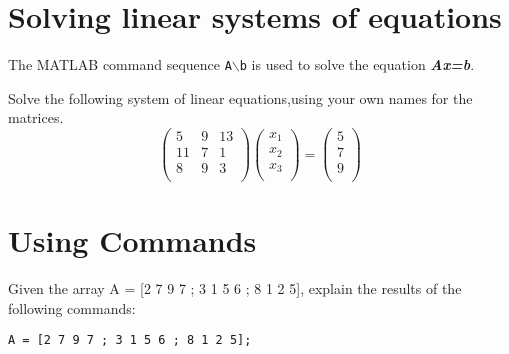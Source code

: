 \documentclass[a4paper,12pt]{article}
\begin{document}
\section{Solving linear systems of equations}

The MATLAB command sequence \texttt{A$\backslash$b} is used to solve the equation  \textbf{\textit{Ax=b}}.


Solve the following system of linear equations,using your own names for the matrices.
\[\left(
\begin{array}{ccc}
5 & 9 & 13 \\
11 & 7 & 1 \\
8 & 9 & 3 \\
\end{array}
\right)
\left(
\begin{array}{c}
x_1 \\
x_2 \\
x_3 \\
\end{array}
\right)
=\left(
\begin{array}{c}
5  \\
7  \\
9  \\
\end{array}
\right)\]


\section{Using Commands}

Given the array A = [2 7 9 7 ; 3 1 5 6 ; 8 1 2 5], explain the results of the following commands:

\begin{framed}
\begin{verbatim}
A = [2 7 9 7 ; 3 1 5 6 ; 8 1 2 5];

\end{verbatim}
\end{framed}
\end{document}

